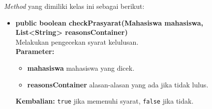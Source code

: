 \begin{enumerate}
\begin{itemize}
		\textit{Method} yang dimiliki kelas ini sebagai berikut:
		\begin{itemize}
			\item \textbf{public boolean checkPrasyarat(Mahasiswa mahasiswa, List<String> reasonsContainer)}\\
			Melakukan pengecekan syarat kelulusan.\\
			\textbf{Parameter:}
			\begin{itemize}
				\item \textbf{mahasiswa} mahasiswa yang dicek.
				\item \textbf{reasonsContainer} alasan-alasan yang ada jika tidak lulus.
			\end{itemize}
			\textbf{Kembalian:} \texttt{true} jika memenuhi syarat, \texttt{false} jika tidak.
		\end{itemize}
	\end{itemize}
	

\end{enumerate}
